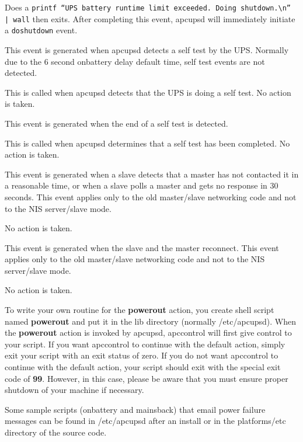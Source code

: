 {{{{{{{{\begin{description}
Does a {\tt printf ``UPS battery runtime limit exceeded. Doing
shutdown.\textbackslash{}n'' | wall} then exits. After completing this event,
apcupsd will immediately initiate a {\tt doshutdown} event.  

\item [startselftest]
   This event is generated when apcupsd detects a self test by the UPS. Normally
due to the 6 second onbattery delay default time, self test events are not
detected.  

This is called when apcupsd detects that the UPS is doing a self test. No
action is taken.  

\item [endselftest]
   This event is generated when the end of a self test is detected.  

This is called when apcupsd determines that a self test has been completed. No
action is taken.  

\item [mastertimeout]
   This event is generated when a slave detects that a master has not contacted
it in a reasonable time, or when a slave polls a master and gets no response
in 30 seconds. This event applies only to the old master/slave networking code
and not to the NIS server/slave mode.  

No action is taken.  

\item [masterconnect]
   This event is generated when the slave and the master reconnect. This event
applies only to the old master/slave networking code and not to the NIS
server/slave mode.  

No action is taken. 
\end{description}

To write your own routine for the {\bf powerout} action, you create shell
script named {\bf powerout} and put it in the lib directory (normally
/etc/apcupsd).  When the {\bf powerout} action is invoked by apcupsd,
apccontrol will first give control to your script.  If you want apccontrol to
continue with the default action, simply exit your script with an exit status
of zero.  If you do not want apccontrol to continue with the default action,
your script should exit with the special exit code of {\bf 99}.  However, in
this case, please be aware that you must ensure proper shutdown of your
machine if necessary.  

Some sample scripts (onbattery and mainsback) that email power failure
messages can be found in /etc/apcupsd after an install or in the
platforms/etc directory of the source code.

}}}}}}}}
